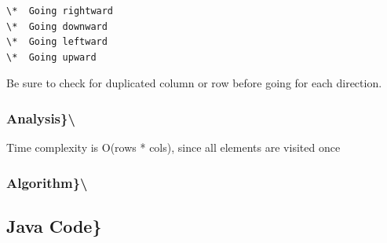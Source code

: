 \documentclass[]{book}
\begin{document}
\begin{verbatim}
\*  Going rightward
\*  Going downward
\*  Going leftward
\*  Going upward
\end{verbatim}

Be sure to check for duplicated column or row before going for each direction.

\hypertarget{analysis-46}{%
\subsubsection{Analysis\}\textbackslash{}}\label{analysis-46}}

Time complexity is O(rows * cols), since all elements are visited once

\hypertarget{algorithm-46}{%
\subsubsection{Algorithm\}\textbackslash{}}\label{algorithm-46}}

\hypertarget{java-code-37}{%
\subsection{Java Code\}}\label{java-code-37}}
\end{document}
